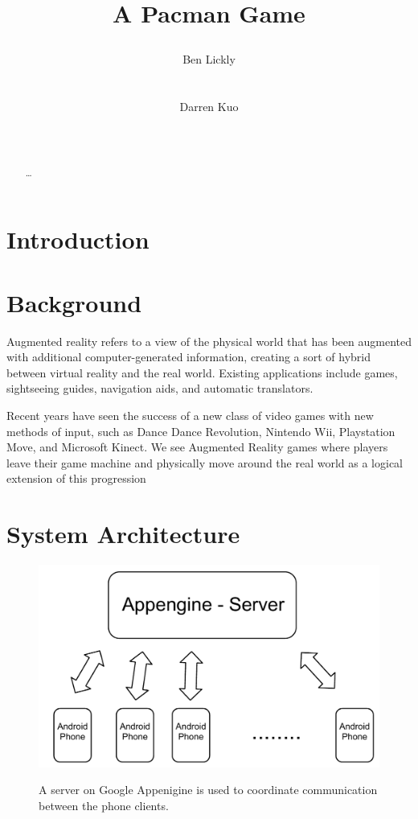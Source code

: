 \documentclass{acm_proc_article-sp}
\title{A Pacman Game
\numberofauthors{2}
\author{
\alignauthor Ben Lickly \\
       \affaddr{University of California, Berkeley}\\
       \affaddr{Berkeley, CA, USA} \\
       \email{blickly@eecs.berkeley.edu}
\alignauthor Darren Kuo \\
       \affaddr{University of California, Berkeley}\\
       \affaddr{Berkeley, CA, USA} \\
       \email{darrenkuo@eecs.berkeley.edu}
}
}
\begin{document}
\maketitle

\begin{abstract}
\ldots
\cite{ZombieRun}
\end{abstract}

\section{Introduction}
\section{Background}
Augmented reality refers to a view of the physical world that has been
augmented with additional computer-generated information, creating a sort of
hybrid between virtual reality and the real world. Existing applications
include games, sightseeing guides, navigation aids, and automatic translators.

Recent years have seen the success of a new class of video games with new
methods of input, such as Dance Dance Revolution, Nintendo Wii, Playstation
Move, and Microsoft Kinect. We see Augmented Reality games where players leave
their game machine and physically move around the real world as a logical
extension of this progression

\section{System Architecture}

\begin{figure}
\centering
\includegraphics[scale=0.4]{figs/ServerArchitecture}
\label{fig:ServerArchitecture}
\caption{A server on Google Appenigine is used to coordinate communication between the phone clients.}
\end{figure}
\end{document}
